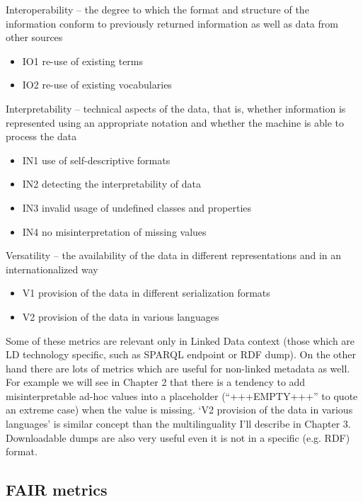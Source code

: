 Interoperability -- the degree to which the format and structure of the information conform to previously returned information as well as data from other sources
\begin{itemize}
 \setlength{\parskip}{0pt}
 \setlength{\itemsep}{0pt plus 1pt}
 \item IO1 re-use of existing terms
 \item IO2 re-use of existing vocabularies
\end{itemize}

Interpretability -- technical aspects of the data, that is, whether information is represented using an appropriate notation and whether the machine is able to process the data
\begin{itemize}
 \setlength{\parskip}{0pt}
 \setlength{\itemsep}{0pt plus 1pt}
 \item IN1 use of self-descriptive formats
 \item IN2 detecting the interpretability of data
 \item IN3 invalid usage of undefined classes and properties
 \item IN4 no misinterpretation of missing values
\end{itemize}

Versatility -- the availability of the data in different representations and in an internationalized way
\vspace{0mm}
\begin{itemize}
 \setlength{\parskip}{0pt}
 \setlength{\itemsep}{0pt plus 1pt}
 \item V1 provision of the data in different serialization formats
 \item V2 provision of the data in various languages
\end{itemize}

Some of these metrics are relevant only in Linked Data context (those which are LD technology specific, such as SPARQL endpoint or RDF dump). On the other hand there are lots of metrics which are useful for non-linked metadata as well. For example we will see in Chapter 2 that there is a tendency to add misinterpretable ad-hoc values into a placeholder (``+++EMPTY+++'' to quote an extreme case) when the value is missing. `V2 provision of the data in various languages' is similar concept than the multilinguality I'll describe in Chapter 3. Downloadable dumps are also very useful even it is not in a specific (e.g. RDF) format.

\subsection{FAIR metrics}


